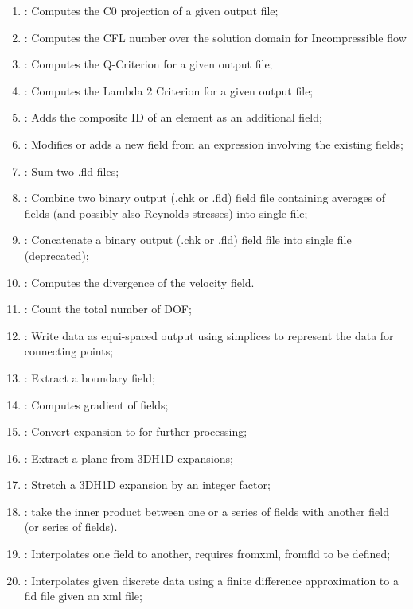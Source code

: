 \begin{enumerate}
\item {}: Computes the C0 projection of a given output file;
\item {}: Computes the CFL number over the solution domain for Incompressible flow
\item {}: Computes the Q-Criterion for a given output file;
\item {}: Computes the Lambda 2 Criterion for a given output file;
\item {}: Adds the composite ID of an element as an additional field;
\item {}: Modifies or adds a new field from an expression involving the existing fields;
\item {}: Sum two .fld files;
\item {}: Combine two \nekpp binary output (.chk or .fld) field file containing averages of fields (and
possibly also Reynolds stresses) into single file;
\item {}: Concatenate a \nekpp binary output (.chk or .fld) field file into single file (deprecated);
\item {}: Computes the divergence of the velocity field.
\item {}: Count the total number of DOF;
\item {}: Write data as equi-spaced output using simplices to represent the data for connecting points;
\item {}: Extract a boundary field;
\item {}: Computes gradient of fields;
\item {}: Convert  expansion to  for further processing;
\item {}: Extract a plane from 3DH1D expansions;
\item {}: Stretch a 3DH1D expansion by an integer factor;
\item {}: take the inner product between one or a series of fields with another field (or series of fields).
\item {}: Interpolates one field to another, requires fromxml, fromfld to be defined;
\item {}: Interpolates given discrete data using a finite difference approximation to a fld file given an xml file;

\end{enumerate}

